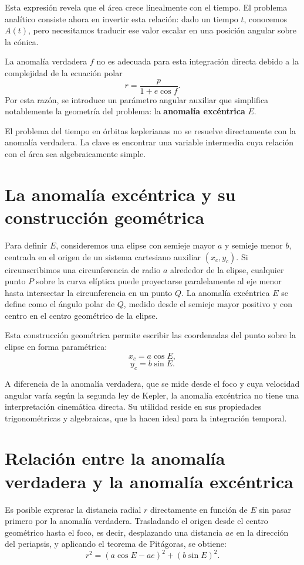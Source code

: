 Esta expresión revela que el área crece linealmente con el tiempo. El problema analítico consiste ahora en invertir esta relación: dado un tiempo \(t\), conocemos \(A(t)\), pero necesitamos traducir ese valor escalar en una posición angular sobre la cónica.

La anomalía verdadera \(f\) no es adecuada para esta integración directa debido a la complejidad de la ecuación polar
\[
 r = \frac{p}{1+e\cos f}.
\]
Por esta razón, se introduce un parámetro angular auxiliar que simplifica notablemente la geometría del problema: la \textbf{anomalía excéntrica} \(E\).

\begin{importante}
El problema del tiempo en órbitas keplerianas no se resuelve directamente con la anomalía verdadera. La clave es encontrar una variable intermedia cuya relación con el área sea algebraicamente simple.
\end{importante}

\section{La anomalía excéntrica y su construcción geométrica}
Para definir \(E\), consideremos una elipse con semieje mayor \(a\) y semieje menor \(b\), centrada en el origen de un sistema cartesiano auxiliar \((x_c,y_c)\). Si circunscribimos una circunferencia de radio \(a\) alrededor de la elipse, cualquier punto \(P\) sobre la curva elíptica puede proyectarse paralelamente al eje menor hasta intersectar la circunferencia en un punto \(Q\). La anomalía excéntrica \(E\) se define como el ángulo polar de \(Q\), medido desde el semieje mayor positivo y con centro en el centro geométrico de la elipse.

Esta construcción geométrica permite escribir las coordenadas del punto sobre la elipse en forma paramétrica:
\[
 x_c = a\cos E,
\]
\[
 y_c = b\sin E.
\]

A diferencia de la anomalía verdadera, que se mide desde el foco y cuya velocidad angular varía según la segunda ley de Kepler, la anomalía excéntrica no tiene una interpretación cinemática directa. Su utilidad reside en sus propiedades trigonométricas y algebraicas, que la hacen ideal para la integración temporal.

\section{Relación entre la anomalía verdadera y la anomalía excéntrica}
Es posible expresar la distancia radial \(r\) directamente en función de \(E\) sin pasar primero por la anomalía verdadera. Trasladando el origen desde el centro geométrico hasta el foco, es decir, desplazando una distancia \(ae\) en la dirección del periapsis, y aplicando el teorema de Pitágoras, se obtiene:
\[
 r^2 = (a\cos E - ae)^2 + (b\sin E)^2.
\]

